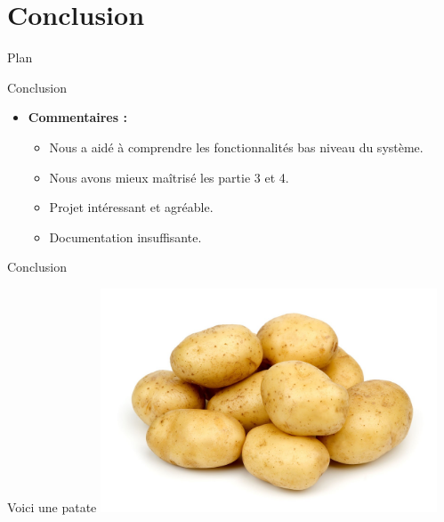 \documentclass{beamer}
\begin{document}
\section{Conclusion}
\begin{frame}{Plan}
    \tableofcontents[currentsection]
\end{frame}

\begin{frame}{Conclusion}
	\begin{itemize}
		\item \textbf{Commentaires :}
		\begin{itemize}
			\item Nous a aidé à comprendre les fonctionnalités bas niveau du système.
			\item Nous avons mieux maîtrisé les partie 3 et 4.
			\item Projet intéressant et agréable.
			\item Documentation insuffisante.
		\end{itemize}
	\end{itemize}
\end{frame}

\begin{frame}{Conclusion}
\end{frame}

\begin{frame}{Voici une patate}
	\includegraphics[width=10cm]{potatoes.jpg}	
\end{frame}
\end{document}
